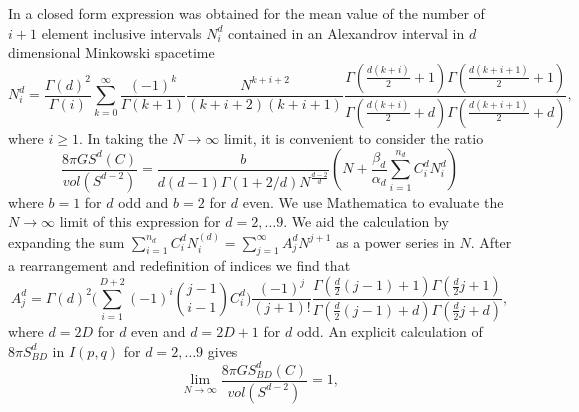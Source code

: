 \documentclass[12pt]{article}
\begin{document}
In \cite{glasersurya} a closed form expression was obtained for the mean value of the number of $i+1$ element inclusive intervals  $N_i^d$ contained in an  Alexandrov interval in $d$ dimensional Minkowski  spacetime 
\begin{equation} 
N_i^d= \frac{\Gamma(d)^2}{\Gamma(i)} \sum_{k=0}^\infty \frac{(-1)^k}{\Gamma(k+1)} \frac{N^{k+i+2}}{(k+i+2)(k+i+1)} \frac{\Gamma(\frac{d(k+i)}{2}+1) \Gamma(\frac{d(k+i+1)}{2}+1)}{\Gamma(\frac{d(k+i)}{2} +d) \Gamma(\frac{d(k+i+1)}{2}+d)}, 
\end{equation}
where $i \geq 1$.   In taking the $N \rightarrow \infty$ limit, it   is convenient to consider the ratio
\begin{equation} 
\frac{ 8 \pi G S^d(C)}{vol(S^{d-2})} = \frac{b}{d(d-1) \Gamma(1+2/d) N^{\frac{d-2}{d}}} \left( N + \frac{\beta_d}{\alpha_d} \sum_{i=1}^{n_d} C_i^d N_i^d \right)  
\label{ratio} 
\end{equation} 
where $b=1$ for $d$ odd and $b=2$ for $d$ even. 
We use Mathematica to evaluate the $N \rightarrow \infty$  limit of this expression for $d=2, \ldots 9$. We aid the calculation by expanding the sum  $\sum_{i=1}^{n_d} C_i^d N_i^{(d)} = \sum_{j=1}^\infty A_j^d N^{j+1}$ as a  power series in  $N$. After a rearrangement and redefinition of indices we find that 
\begin{equation}
 A_j^d = \Gamma(d)^2\biggl( \sum_{i=1}^{D+2} (-1)^i \binom{j-1}{i-1}  C_i^d  \biggr) \frac{(-1)^j}{(j+1)!}\frac{\Gamma(\frac{d}{2}(j-1)+1)\Gamma(\frac{d}{2}j+1)}{\Gamma(\frac{d}{2}(j-1)+d) \Gamma(\frac{d}{2}j+d)}, 
\end{equation} 
where $d=2D$ for $d$ even and $d=2D+1$ for $d$ odd.   
An explicit  calculation of $8\pi S_{BD}^d$ in $I(p,q)$ for $d=2, \ldots 9$  gives 
\begin{equation} 
\lim_{N \rightarrow \infty} \frac{ 8 \pi G S_{BD}^d(C)}{vol(S^{d-2})} = 1,  
\label{result} 
\end{equation} 
\end{document}
